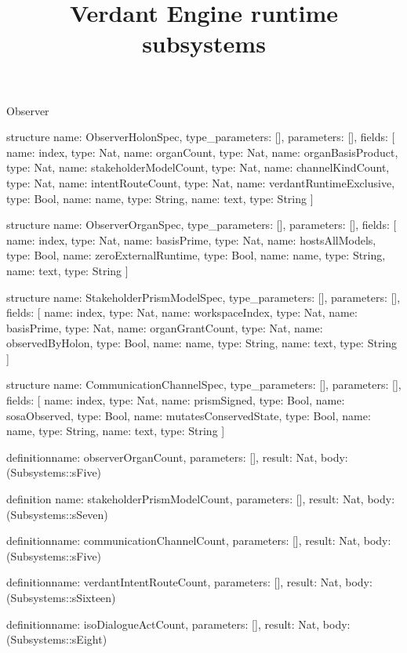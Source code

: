 \begin{lexlean}{Observer}
\title{Verdant Engine runtime subsystems}
\begin{semanticmodule}
structure{
  name: ObserverHolonSpec,
  type_parameters: [],
  parameters: [],
  fields: [
    {name: index, type: Nat},
    {name: organCount, type: Nat},
    {name: organBasisProduct, type: Nat},
    {name: stakeholderModelCount, type: Nat},
    {name: channelKindCount, type: Nat},
    {name: intentRouteCount, type: Nat},
    {name: verdantRuntimeExclusive, type: Bool},
    {name: name, type: String},
    {name: text, type: String}
  ]
}

structure{
  name: ObserverOrganSpec,
  type_parameters: [],
  parameters: [],
  fields: [
    {name: index, type: Nat},
    {name: basisPrime, type: Nat},
    {name: hostsAllModels, type: Bool},
    {name: zeroExternalRuntime, type: Bool},
    {name: name, type: String},
    {name: text, type: String}
  ]
}

structure{
  name: StakeholderPrismModelSpec,
  type_parameters: [],
  parameters: [],
  fields: [
    {name: index, type: Nat},
    {name: workspaceIndex, type: Nat},
    {name: basisPrime, type: Nat},
    {name: organGrantCount, type: Nat},
    {name: observedByHolon, type: Bool},
    {name: name, type: String},
    {name: text, type: String}
  ]
}

structure{
  name: CommunicationChannelSpec,
  type_parameters: [],
  parameters: [],
  fields: [
    {name: index, type: Nat},
    {name: prismSigned, type: Bool},
    {name: sosaObserved, type: Bool},
    {name: mutatesConservedState, type: Bool},
    {name: name, type: String},
    {name: text, type: String}
  ]
}

definition{name: observerOrganCount, parameters: [], result: Nat, body: (Subsystems::sFive)}

definition{
  name: stakeholderPrismModelCount,
  parameters: [],
  result: Nat,
  body: (Subsystems::sSeven)
}

definition{name: communicationChannelCount, parameters: [], result: Nat, body: (Subsystems::sFive)}

definition{name: verdantIntentRouteCount, parameters: [], result: Nat, body: (Subsystems::sSixteen)}

definition{name: isoDialogueActCount, parameters: [], result: Nat, body: (Subsystems::sEight)}


\end{semanticmodule}
\end{lexlean}
